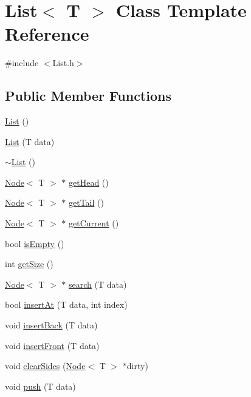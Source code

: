 \hypertarget{class_list}{}\section{List$<$ T $>$ Class Template Reference}
\label{class_list}


{\ttfamily \#include $<$List.\+h$>$}

\subsection*{Public Member Functions}
\begin{DoxyCompactItemize}
\item 
\hyperlink{class_list_a5c5e27671b21b3815d4e25b953c69454}{List} ()
\item 
\hyperlink{class_list_a054ab94d95915e2a3b8945cbdf51a42b}{List} (T data)
\item 
\hyperlink{class_list_a2b58189090f6e5ce52939c9195e59e85}{$\sim$\+List} ()
\item 
\hyperlink{class_node}{Node}$<$ T $>$ $\ast$ \hyperlink{class_list_a786c0ed42a576a1c56b20ab892f51d27}{get\+Head} ()
\item 
\hyperlink{class_node}{Node}$<$ T $>$ $\ast$ \hyperlink{class_list_aeadc86b707f794159f58a63aadd43947}{get\+Tail} ()
\item 
\hyperlink{class_node}{Node}$<$ T $>$ $\ast$ \hyperlink{class_list_a53de13994a40e64c7ded3937d519c991}{get\+Current} ()
\item 
bool \hyperlink{class_list_a73f8b1d313382daffeeeed552f42da2f}{is\+Empty} ()
\item 
int \hyperlink{class_list_ae2afa15a07b88a3a678969522cc14988}{get\+Size} ()
\item 
\hyperlink{class_node}{Node}$<$ T $>$ $\ast$ \hyperlink{class_list_af6e64cae6cfa23efd13be7c1ee1bff75}{search} (T data)
\item 
bool \hyperlink{class_list_a62f806c2e345baff40798902f98722f3}{insert\+At} (T data, int index)
\item 
void \hyperlink{class_list_ab6b782189c3b9d5bd184428e7089576f}{insert\+Back} (T data)
\item 
void \hyperlink{class_list_ad1f90c530106d07bf59b80d5113e78cd}{insert\+Front} (T data)
\item 
void \hyperlink{class_list_ae026c56757ce1a696274813c00033404}{clear\+Sides} (\hyperlink{class_node}{Node}$<$ T $>$ $\ast$dirty)
\item 
void \hyperlink{class_list_a7aedb99ebfb318e7e847ab80a1c0207c}{push} (T data)

\end{DoxyCompactItemize}

